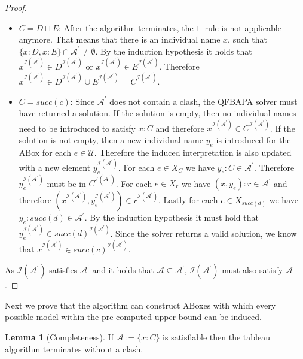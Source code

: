 \documentclass{book}
\theoremstyle{break}
\theoremstyle{definition}
\newtheorem{mylem}{Lemma}
\begin{document}
\begin{proof}
\begin{itemize}
\item $C=D\sqcup E$: After the algorithm terminates, the $\sqcup$-rule is not applicable anymore. That means that there is an individual name $x$, such that $\{x:D, x:E\}\cap \mathcal{A}^\prime\neq \emptyset$. By the induction hypothesis it holds that $x^{\mathcal{I}(\mathcal{A}^\prime)}\in D^{\mathcal{I}(\mathcal{A}^\prime)}$ or $x^{\mathcal{I}(\mathcal{A}^\prime)}\in E^{\mathcal{I}(\mathcal{A}^\prime)}$. Therefore $x^{\mathcal{I}(\mathcal{A}^\prime)}\in D^{\mathcal{I}(\mathcal{A}^\prime)}\cup E^{\mathcal{I}(\mathcal{A}^\prime)}=C^{\mathcal{I}(\mathcal{A}^\prime)}$.
\item $C=succ(c)$: Since $\mathcal{A}^\prime$ does not contain a clash, the QFBAPA solver must have returned a solution. If the solution is empty, then no individual names need to be introduced to satisfy $x:C$ and therefore $x^{\mathcal{I}(\mathcal{A}^\prime)}\in C^{\mathcal{I}(\mathcal{A}^\prime)}$. If the solution is not empty, then a new individual name $y_e$ is introduced for the ABox for each $e\in\mathcal{U}$. Therefore the induced interpretation is also updated with a new element $y_e^{\mathcal{I}(\mathcal{A}^\prime)}$. For each $e\in X_C$ we have $y_e:C\in \mathcal{A}^\prime$. Therefore $y_e^{\mathcal{I}(\mathcal{A}^\prime)}$ must be in $C^{\mathcal{I}(\mathcal{A}^\prime)}$. For each $e\in X_r$ we have $(x,y_e):r\in\mathcal{A}^\prime$ and therefore $(x^{\mathcal{I}(\mathcal{A}^\prime)},y_e^{\mathcal{I}(\mathcal{A}^\prime)})\in r^{\mathcal{I}(\mathcal{A}^\prime)}$. Lastly for each $e\in X_{succ(d)}$ we have $y_e:succ(d)\in\mathcal{A}^\prime$. By the induction hypothesis it must hold that $y_e^{\mathcal{I}(\mathcal{A}^\prime)}\in succ(d)^{\mathcal{I}(\mathcal{A}^\prime)}$. Since the solver returns a valid solution, we know that $x^{\mathcal{I}(\mathcal{A}^\prime)}\in succ(c)^{\mathcal{I}(\mathcal{A}^\prime)}$.
\end{itemize}
As $\mathcal{I}(\mathcal{A}^\prime)$ satisfies $\mathcal{A}^\prime$ and it holds that $\mathcal{A}\subseteq \mathcal{A}^\prime$, $\mathcal{I}(\mathcal{A}^\prime)$ must also satisfy $\mathcal{A}$.
\end{proof}
Next we prove that the algorithm can construct ABoxes with which every possible model within the pre-computed upper bound can be induced.
\begin{mylem}[Completeness]
If $\mathcal{A}:=\{x:C\}$ is satisfiable then the tableau algorithm terminates without a clash.
\end{mylem}
\end{document}

